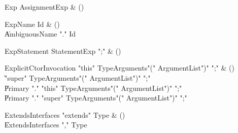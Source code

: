 \begin{bbgrammar}

Exp \label{prod:Exp}  \: AssignmentExp & () \\


\end{bbgrammar}

\begin{bbgrammar}

ExpName \label{prod:ExpName}  \: Id & () \\

    \| AmbiguousName \xcd"." Id \\

\end{bbgrammar}

\begin{bbgrammar}

ExpStatement \label{prod:ExpStatement}  \: StatementExp \xcd";" & () \\


\end{bbgrammar}

\begin{bbgrammar}

ExplicitCtorInvocation \label{prod:ExplicitCtorInvocation}  \: \xcd"this" TypeArguments\opt \xcd"(" ArgumentList\opt \xcd")" \xcd";" & () \\

    \| \xcd"super" TypeArguments\opt \xcd"(" ArgumentList\opt \xcd")" \xcd";" \\
    \| Primary \xcd"." \xcd"this" TypeArguments\opt \xcd"(" ArgumentList\opt \xcd")" \xcd";" \\
    \| Primary \xcd"." \xcd"super" TypeArguments\opt \xcd"(" ArgumentList\opt \xcd")" \xcd";" \\

\end{bbgrammar}

\begin{bbgrammar}

ExtendsInterfaces \label{prod:ExtendsInterfaces}  \: \xcd"extends" Type & () \\

    \| ExtendsInterfaces \xcd"," Type \\

\end{bbgrammar}

